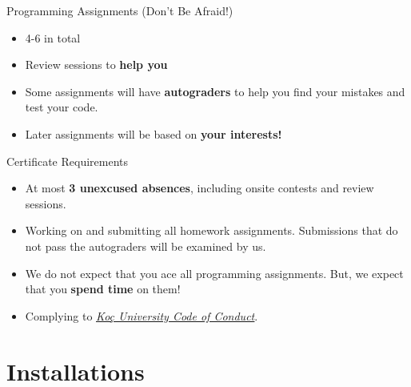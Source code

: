 		\begin{frame}{Programming Assignments \pause (Don't Be Afraid!)}
			\pause
			\pause
			\begin{itemize}
				\LARGE
				\item 4-6 in total
				\pause
				\item Review sessions to \textbf{help you}
				\pause
				\item Some assignments will have \textbf{autograders} to help you find your mistakes and test your code.
				\pause
				\item Later assignments will be based on \textbf{your interests!}
			\end{itemize}
			{
			
				\begin{center}
				\end{center}
			}
			
		\end{frame}

		\begin{frame}{Certificate Requirements}
			\pause
			\begin{itemize}
				\LARGE
				\item At most \textbf{3 unexcused absences}, including onsite contests and review sessions.
				\pause
				\item Working on and submitting all homework assignments. Submissions that do not pass the autograders will be examined by us.
				\pause
				\item We do not expect that you ace all programming assignments. But, we expect that you \textbf{spend time} on them!
				\pause
				\item Complying to \href{https://vpaa.ku.edu.tr/academic/student-code-of-conduct}{\underline{\textit{Koç University Code of Conduct}}}. 
			\end{itemize}
		\end{frame}

	\section{Installations}

